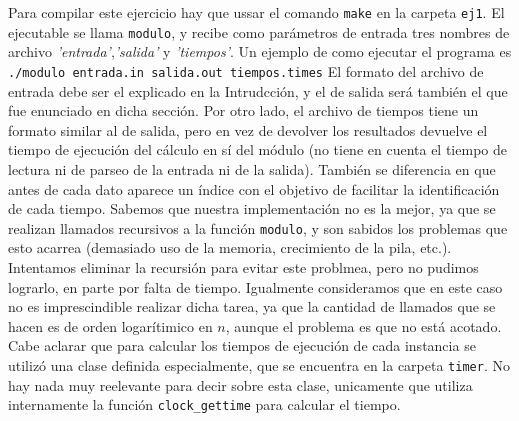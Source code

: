 Para compilar este ejercicio hay que ussar el comando \texttt{make} en la carpeta \texttt{ej1}.
\newline
El ejecutable se llama \texttt{modulo}, y recibe como parámetros de entrada tres nombres de archivo \emph{'entrada'},\emph{'salida'} y \emph{'tiempos'}. Un ejemplo de como ejecutar el programa es \texttt{./modulo entrada.in salida.out tiempos.times}
\newline
El formato del archivo de entrada debe ser el explicado en la Intrudcción, y el de salida será también el que fue enunciado en dicha sección. Por otro lado, el archivo de tiempos tiene un formato similar al de salida, pero en vez de devolver los resultados devuelve el tiempo de ejecución del cálculo en sí del módulo (no tiene en cuenta el tiempo de lectura ni de parseo de la entrada ni de la salida). También se diferencia en que antes de cada dato aparece un índice con el objetivo de facilitar la identificación de cada tiempo.
\newline
Sabemos que nuestra implementación no es la mejor, ya que se realizan llamados recursivos a la función \texttt{modulo}, y son sabidos los problemas que esto acarrea (demasiado uso de la memoria, crecimiento de la pila, etc.). Intentamos eliminar la recursión para evitar este problmea, pero no pudimos lograrlo, en parte por falta de tiempo. Igualmente consideramos que en este caso no es imprescindible realizar dicha tarea, ya que la cantidad de llamados que se hacen es de orden logarítimico en $n$, aunque el problema es que no está acotado.
\newline
Cabe aclarar que para calcular los tiempos de ejecución de cada instancia se utilizó una clase definida especialmente, que se encuentra en la carpeta \texttt{timer}. No hay nada muy reelevante para decir sobre esta clase, unicamente que utiliza internamente la función \texttt{clock_gettime} para calcular el tiempo.
